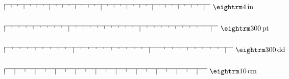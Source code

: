 $$ \abovedisplayskip 15pt plus 4pt minus 4pt
\belowdisplayskip 15pt plus 4pt minus 4pt
\vbox{
\def\1{\vrule height 0pt depth 2pt}
\def\2{\vrule height 0pt depth 4pt}
\def\3{\vrule height 0pt depth 6pt}
\def\4{\vrule height 0pt depth 8pt}
\def\ruler#1#2#3{\leftline{$\vcenter{\hrule\hbox{\4#1}}\,\,\rm#2\,{#3}$}}
\def\\#1{\hbox to .125in{\hfil#1}}
\def\8{\\\1\\\2\\\1\\\3\\\1\\\2\\\1\\\4}
\ruler{\8\8\8\8}4{in}
\vskip 18pt
\def\\#1{\hbox to 10pt{\hfil#1}}
\def\8{\\\1\\\1\\\1\\\1\\\2\\\1\\\1\\\1\\\1\\\4}
\ruler{\8\8\8}{300}{pt}
\vskip 18pt
\def\\#1{\hbox to 10dd{\hfil#1}}
\def\8{\\\1\\\1\\\1\\\1\\\2\\\1\\\1\\\1\\\1\\\4}
\ruler{\8\8\8}{300}{dd}
\vskip 18pt
\def\\#1{\hbox to 5mm{\hfil#1}}
\def\8{\\\2\\\4}
\ruler{\8\8\8\8\8\8\8\8\8\8}{10}{cm}
\vskip 6pt}$$

